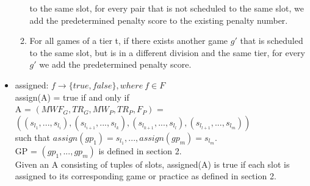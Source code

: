 \documentclass[12 pt]{article}        	%
\begin{document}
\begin{itemize}
\begin{enumerate}
to the same slot, for every pair that is not scheduled to the same slot, we
add the predetermined penalty score to the existing penalty number.
    \item For all games of a tier t, if there exists another game $g'$ that is scheduled to the same slot, but is in a different division and the same tier, for every $g'$ we add the predetermined penalty score.
\end{enumerate}
\item assigned: $f \to \{true, false\}, where \: f \in F$
\\assign(A) = true if and only if 
\\ A = $(MWF_G, TR_G, MW_P, TR_P, F_P)$ = $((s_{l_1}, ..., s_{l_i}), (s_{l_{i+1}}, ..., s_{l_k}), (s_{l_{k+1}}, ..., s_{l_l}), (s_{l_{l+1}}, ..., s_{l_m}))$
\\ such that $assign(gp_1) = s_{l_1}, ..., assign(gp_m) = s_{l_m}$.
\\GP = $(gp_1, ..., gp_m)$ is defined in section 2.
\\Given an A consisting of tuples of slots, assigned(A) is true if each slot is assigned to its corresponding game or practice as defined in section 2. 
\end{itemize}
\end{document}
